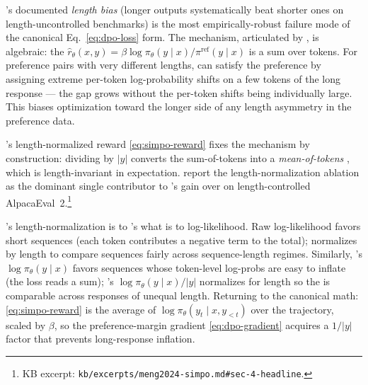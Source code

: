 's documented \emph{length bias} (longer outputs systematically beat
shorter ones on length-uncontrolled benchmarks) is the most
empirically-robust failure mode of the canonical Eq.~\cref{eq:dpo-loss}
form. The mechanism, articulated by \citet[\S 3]{meng2024-simpo}, is
algebraic: the 
$\hat r_\theta(x, y) = \beta \log \pi_\theta(y \mid x) /
\pi^{\mathrm{ref}}(y \mid x)$ is a sum over tokens. For preference pairs
with very different lengths,  can satisfy the preference by assigning
extreme per-token log-probability shifts on a few tokens of the long
response --- the  gap grows without the per-token
shifts being individually large. This biases optimization toward the
longer side of any length asymmetry in the preference data.

's length-normalized reward \cref{eq:simpo-reward} fixes the
mechanism by construction: dividing by $|y|$ converts the sum-of-tokens
 into a \emph{mean-of-tokens} , which is
length-invariant in expectation. \citet[\S 4.2]{meng2024-simpo} report
the length-normalization ablation as the dominant single contributor to
's gain over  on length-controlled
AlpacaEval~2.\footnote{KB excerpt:
\nolinkurl{kb/excerpts/meng2024-simpo.md#sec-4-headline}.}

\begin{intuition}
's length-normalization is to 's  what
 is to log-likelihood. Raw log-likelihood favors short
sequences (each token contributes a negative term to the total);
 normalizes by length to compare sequences fairly across
sequence-length regimes. Similarly, 's $\log \pi_\theta(y \mid x)$
favors sequences whose token-level log-probs are easy to inflate (the
loss reads a sum); 's $\log \pi_\theta(y \mid x) / |y|$ normalizes
for length so the  is comparable across responses of
unequal length. Returning to the canonical math:
\cref{eq:simpo-reward} is the average of $\log \pi_\theta(y_t \mid x,
y_{<t})$ over the trajectory, scaled by $\beta$, so the
preference-margin gradient \cref{eq:dpo-gradient} acquires a
$1 / |y|$ factor that prevents long-response inflation.
\end{intuition}

